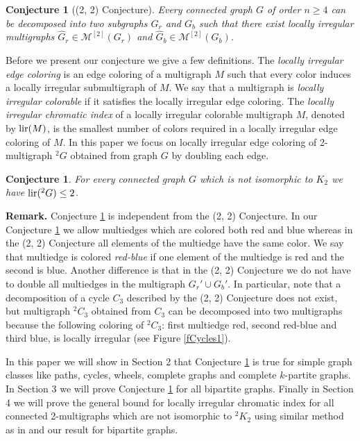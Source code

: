 \documentclass[12pt]{article}
\newtheorem{cnj}[tw]{Conjecture}
\begin{document}
\begin{cnj}[(2, 2) Conjecture]
\label{2,2n}
Every connected graph $G$ of order \linebreak $n\geq4$ can be decomposed into two subgraphs $G_r$ and $G_b$ such that there exist locally irregular multigraphs $\hat G_r\in \mathcal{M}^{[2]}(G_r)$ and $\hat G_b\in \mathcal{M}^{[2]}(G_b)$. 
\end{cnj}

Before we present our conjecture we give a few definitions. The \textit{locally irregular edge coloring} is an edge coloring of a multigraph $M$ such that every color induces a locally irregular submultigraph of $M$. We say that a multigraph is \textit{locally irregular colorable} if it satisfies the locally irregular edge coloring. The \textit{locally irregular chromatic index} of a locally irregular colorable multigraph $M$, denoted by ${\rm lir}(M)$, is the smallest number of colors required in a locally irregular edge coloring of $M$. In this paper we focus on locally irregular edge coloring of 2-multigraph $^2G$ obtained from graph $G$ by doubling each edge.   
\begin{cnj}
\label{main}
For every connected graph $G$ which is not isomorphic to $K_2$ we have ${\rm lir}(^2G)\leq 2$.
\end{cnj}

\textbf{Remark.} Conjecture \ref{main} is independent from the (2, 2) Conjecture. In our Conjecture \ref{main} we allow multiedges which are colored both red and blue whereas in the (2, 2) Conjecture all elements of the multiedge have the same color. We say that multiedge is colored \textit{red-blue} if one element of the multiedge is red and the second is blue. Another difference is that in the \linebreak (2, 2) Conjecture we do not have to double all multiedges in the multigraph $G_r' \cup G_b'$. In particular, note that a decomposition of a cycle $C_3$ described by the (2, 2) Conjecture does not exist, but multigraph $^2C_3$ obtained from $C_3$ can be decomposed into two multigraphs because the following coloring of $^2C_3$: first multiedge red, second red-blue and third blue, is locally irregular (see Figure \ref{fCycles1}).

In this paper we will show in Section 2 that Conjecture \ref{main} is true for simple graph classes like paths, cycles, wheels, complete graphs and complete $k$-partite graphs. In Section 3 we will prove Conjecture \ref{main} for all bipartite graphs. Finally in Section 4 we will prove the general bound for locally irregular chromatic index for all connected 2-multigraphs which are not isomorphic to $^2K_2$ using similar method as in \cite{Bensmail Merker Thomassen} and our result for bipartite graphs. 
\end{document}
